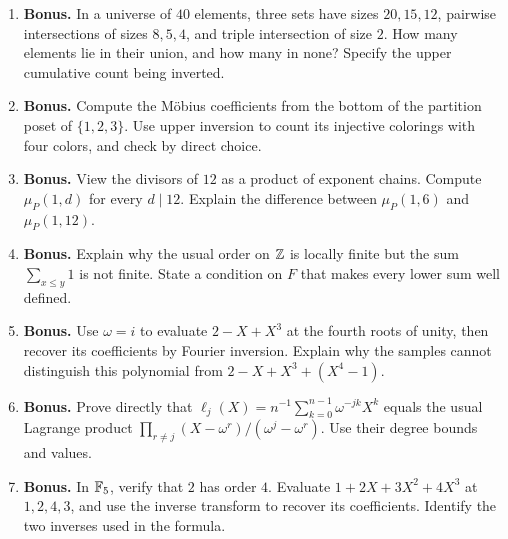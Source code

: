 \begin{exercisebox}
\begin{enumerate}
  why is ``alternate signs along the chain'' the wrong rule?
  \item \textbf{Bonus.} In a universe of $40$ elements, three sets
  have sizes $20,15,12$, pairwise intersections of sizes $8,5,4$,
  and triple intersection of size $2$. How many elements lie in
  their union, and how many in none? Specify the upper cumulative
  count being inverted. 
  \item \textbf{Bonus.} Compute the M\"obius coefficients from
  the bottom of the partition poset of $\{1,2,3\}$. Use upper
  inversion to count its injective colorings with four colors,
  and check by direct choice. 
  \item \textbf{Bonus.} View the divisors of $12$ as a product
  of exponent chains. Compute $\mu_P(1,d)$ for every $d\mid12$.
  Explain the difference between $\mu_P(1,6)$ and $\mu_P(1,12)$.
  \item \textbf{Bonus.} Explain why the usual order on $\mathbb Z$ is
  locally finite but the sum $\sum_{x\le y}1$ is not finite.
  State a condition on $F$ that makes every lower sum well defined.
  \item \textbf{Bonus.} Use $\omega=i$ to evaluate $2-X+X^3$
  at the fourth roots of unity, then recover its coefficients by
  Fourier inversion. Explain why the samples cannot distinguish
  this polynomial from $2-X+X^3+(X^4-1)$. 
  \item \textbf{Bonus.} Prove directly that
  $\ell_j(X)=n^{-1}\sum_{k=0}^{n-1}\omega^{-jk}X^k$
  equals the usual Lagrange product
  $\prod_{r\ne j}(X-\omega^r)/(\omega^j-\omega^r)$.
  Use their degree bounds and values. 
  \item \textbf{Bonus.} In $\mathbb F_5$, verify that $2$ has order $4$.
  Evaluate $1+2X+3X^2+4X^3$ at $1,2,4,3$, and use the inverse
  transform to recover its coefficients. Identify the two inverses
  used in the formula. 
\end{enumerate}
\end{exercisebox}
